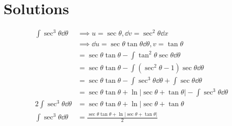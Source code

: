 \documentclass{article}
\begin{document}
	\section{Solutions}
		\begin{align*}
			\int \sec^3\theta \dd\theta &\implies u = \sec\theta, \dd{v} = \sec^2\theta\dd{x} \\
				&\implies \dd{u} = \sec\theta\tan\theta\dd{\theta}, v = \tan\theta \\
				&= \sec\theta\tan\theta - \int \tan^2\theta\sec\theta \dd{\theta} \\
				&= \sec\theta\tan\theta - \int (\sec^2\theta - 1)\sec\theta \dd{\theta} \\
				&= \sec\theta\tan\theta - \int\sec^3\theta \dd{\theta} + \int \sec\theta \dd{\theta} \\
				&= \sec\theta\tan\theta + \ln|\sec\theta + \tan\theta| - \int{\sec^3}\theta \dd{\theta} \\
			2\int \sec^3\theta \dd{\theta} &= \sec\theta\tan\theta + \ln|\sec\theta + \tan\theta\\
			\int \sec^3\theta \dd{\theta} &= \frac{\sec\theta\tan\theta + \ln|\sec\theta + \tan\theta|}{2}
		\end{align*}
\end{document}
